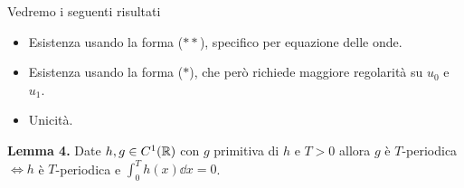 



Vedremo i seguenti risultati

\begin{itemize}
	\item Esistenza usando la forma ($**$), specifico per equazione delle onde.
	\item Esistenza usando la forma ($*$), che però richiede maggiore regolarità su $u_0$ e $u_1$.
	\item Unicità.
\end{itemize}


\textbf{Lemma 4.}
Date $h, g \in C^1(\mathbb R)$ con $g$ primitiva di $h$ e $T > 0$ allora $g$ è $T$-periodica $\iff h$ è $T$-periodica e $\int_0^T h(x) \dd x = 0$.

